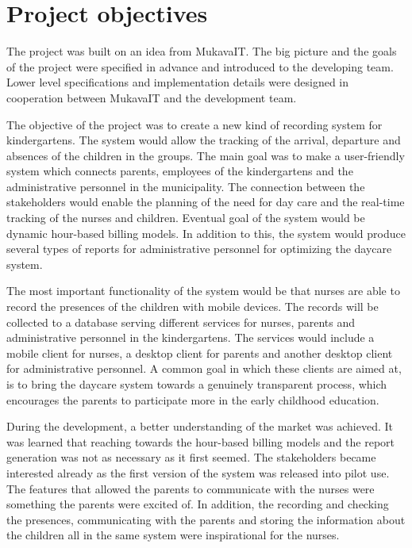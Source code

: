 
 \section{Project objectives}

The project was built on an idea from MukavaIT. The big picture and the goals of the project were specified in advance and introduced to the developing team. Lower level specifications and implementation details were designed in cooperation between MukavaIT and the development team.

The objective of the project was to create a new kind of recording system for kindergartens. The system would allow the tracking of the arrival, departure and absences of the children in the groups. The main goal was to make a user-friendly system which connects parents, employees of the kindergartens and the administrative personnel in the municipality. The connection between the stakeholders would enable the planning of the need for day care and the real-time tracking of the nurses and children. Eventual goal of the system would be dynamic hour-based billing models. In addition to this, the system would produce several types of reports for administrative personnel for optimizing the daycare system.

The most important functionality of the system would be that nurses are able to record the presences of the children with mobile devices. The records will be collected to a database serving different services for nurses, parents and administrative personnel in the kindergartens. The services would include a mobile client for nurses, a desktop client for parents and another desktop client for administrative personnel. A common goal in which these clients are aimed at, is to bring the daycare system towards a genuinely transparent process, which encourages the parents to participate more in the early childhood education.

During the development, a better understanding of the market was achieved. It was learned that reaching towards the hour-based billing models and the report generation was not as necessary as it first seemed. The stakeholders became interested already as the first version of the system was released into pilot use. The features that allowed the parents to communicate with the nurses were something the parents were excited of. In addition, the recording and checking the presences, communicating with the parents and storing the information about the children all in the same system were inspirational for the nurses.

